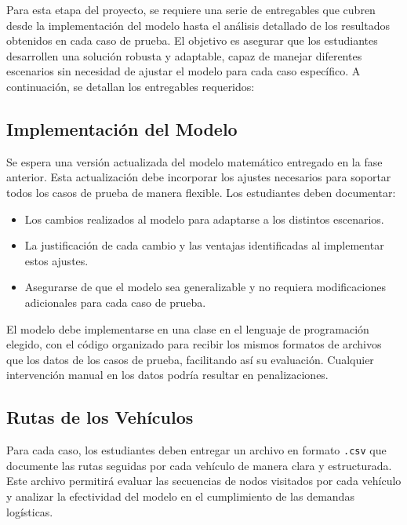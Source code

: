 \documentclass[12pt]{article}
\begin{document}
Para esta etapa del proyecto, se requiere una serie de entregables que cubren desde la implementación del modelo hasta el análisis detallado de los resultados obtenidos en cada caso de prueba. El objetivo es asegurar que los estudiantes desarrollen una solución robusta y adaptable, capaz de manejar diferentes escenarios sin necesidad de ajustar el modelo para cada caso específico. A continuación, se detallan los entregables requeridos:

\subsection{Implementación del Modelo}
Se espera una versión actualizada del modelo matemático entregado en la fase anterior. Esta actualización debe incorporar los ajustes necesarios para soportar todos los casos de prueba de manera flexible. Los estudiantes deben documentar:
\begin{itemize}
    \item Los cambios realizados al modelo para adaptarse a los distintos escenarios.
    \item La justificación de cada cambio y las ventajas identificadas al implementar estos ajustes.
    \item Asegurarse de que el modelo sea generalizable y no requiera modificaciones adicionales para cada caso de prueba.
\end{itemize}
El modelo debe implementarse en una clase en el lenguaje de programación elegido, con el código organizado para recibir los mismos formatos de archivos que los datos de los casos de prueba, facilitando así su evaluación. Cualquier intervención manual en los datos podría resultar en penalizaciones.

\subsection{Rutas de los Vehículos}
Para cada caso, los estudiantes deben entregar un archivo en formato \texttt{.csv} que documente las rutas seguidas por cada vehículo de manera clara y estructurada. Este archivo permitirá evaluar las secuencias de nodos visitados por cada vehículo y analizar la efectividad del modelo en el cumplimiento de las demandas logísticas.
\end{document}
